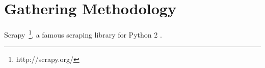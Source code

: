 \section{Gathering Methodology}
Scrapy~\footnote{http://scrapy.org/}, a famous scraping library for Python 2 \cite{mitchell_2015}.